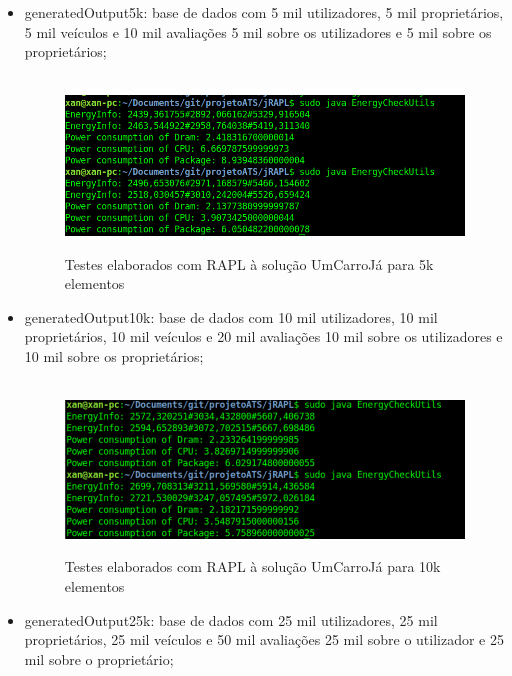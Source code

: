 \begin{itemize}
    \item generatedOutput5k: base de dados com 5 mil utilizadores, 5 mil proprietários, 5 mil veículos e 10 mil avaliações 5 mil sobre os utilizadores e 5 mil sobre os proprietários;
    
        \begin{figure}[H]
            \hbox{\hspace{-8em} \includegraphics[width=1.4\textwidth]{images/rapl_5k_v1.png}}
            \label{fig52}
            \caption{Testes elaborados com RAPL à solução UmCarroJá para 5k elementos}
        \end{figure}
   
    \item generatedOutput10k: base de dados com 10 mil utilizadores, 10 mil proprietários, 10 mil veículos e 20 mil avaliações 10 mil sobre os utilizadores e 10 mil sobre os proprietários;
    
        \begin{figure}[H]
            \hbox{\hspace{-8em} \includegraphics[width=1.4\textwidth]{images/rapl_10k_v1.png}}
            \label{fig53}
            \caption{Testes elaborados com RAPL à solução UmCarroJá para 10k elementos}
        \end{figure}
        
    \item generatedOutput25k: base de dados com 25 mil utilizadores, 25 mil proprietários, 25 mil veículos e 50 mil avaliações 25 mil sobre o utilizador e 25 mil sobre o proprietário;
    

\end{itemize}
